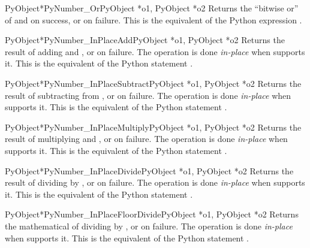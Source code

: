 \documentclass{manual}
\begin{document}
\begin{cfuncdesc}{PyObject*}{PyNumber_Or}{PyObject *o1, PyObject *o2}
Returns the ``bitwise or'' of  and  on success, or
\NULL{} on failure.  This is the equivalent of the Python expression
.
\end{cfuncdesc}


\begin{cfuncdesc}{PyObject*}{PyNumber_InPlaceAdd}{PyObject *o1, PyObject *o2}
Returns the result of adding  and , or \NULL{} on
failure.  The operation is done \emph{in-place} when  supports
it.  This is the equivalent of the Python statement .
\end{cfuncdesc}


\begin{cfuncdesc}{PyObject*}{PyNumber_InPlaceSubtract}{PyObject *o1,
                                                       PyObject *o2}
Returns the result of subtracting  from , or
\NULL{} on failure.  The operation is done \emph{in-place} when
 supports it.  This is the equivalent of the Python statement
.
\end{cfuncdesc}


\begin{cfuncdesc}{PyObject*}{PyNumber_InPlaceMultiply}{PyObject *o1,
                                                       PyObject *o2}
Returns the result of multiplying  and , or \NULL{} on
failure.  The operation is done \emph{in-place} when  supports it. 
This is the equivalent of the Python statement .
\end{cfuncdesc}


\begin{cfuncdesc}{PyObject*}{PyNumber_InPlaceDivide}{PyObject *o1,
                                                     PyObject *o2}
Returns the result of dividing  by , or \NULL{} on
failure.  The operation is done \emph{in-place} when  supports
it. This is the equivalent of the Python statement .
\end{cfuncdesc}


\begin{cfuncdesc}{PyObject*}{PyNumber_InPlaceFloorDivide}{PyObject *o1,
                                                          PyObject *o2}
Returns the mathematical of dividing  by , or \NULL{}
on failure.  The operation is done \emph{in-place} when 
supports it.  This is the equivalent of the Python statement
.
\end{cfuncdesc}
\end{document}
